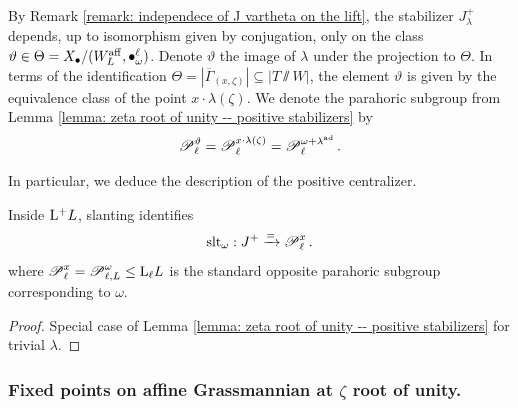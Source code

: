 \begin{remark}\label{remark: positive stabilizers -- zeta root of unity}
By Remark \ref{remark: independece of J vartheta on the lift}, the stabilizer $J^{+}_{\lambda}$ depends, up to isomorphism given by conjugation, only on the class $\vartheta \in \Theta = X_{\bullet} / (W^{\mathrm{aff}}_{L}, \bullet^{\ell}_{\omega})$. Denote $\vartheta$ the image of $\lambda$ under the projection to $\Theta$. In terms of the identification $\Theta = |\overline{\Gamma}_{(x, \zeta)}| \subseteq |T \sslash W|$, the element $\vartheta$ is given by the equivalence class of the point $x \cdot \lambda(\zeta)$. We denote the parahoric subgroup from Lemma \ref{lemma: zeta root of unity -- positive stabilizers} by
\begin{equation*}
 \operatorname{\mathscr{P}}^{\vartheta}_{\ell} 
 = \operatorname{\mathscr{P}}^{x \cdot \lambda(\zeta)}_{\ell} 
 = \operatorname{\mathscr{P}}_{\ell}^{\omega+\lambda^{\operatorname{ad}}}.  
\end{equation*}    
\end{remark}

In particular, we deduce the description of the positive centralizer.
\begin{lemma}\label{lemma: zeta root of unity -- positive centralizer}
\label{lemma: H^+ conjugates to P via alpha general case roots of unity}
Inside $\mathrm{L^+} L$, slanting identifies
\begin{equation*}
\operatorname{slt}_{\omega}: J^{+} \xrightarrow{=} \operatorname{\mathscr{P}}_{\ell}^{x}.
\end{equation*}
where $\operatorname{\mathscr{P}}_{\ell}^{x} = \operatorname{\mathscr{P}}_{\ell, L}^{\omega} \leq \mathrm{L}_{\ell} L$ is the standard opposite parahoric subgroup corresponding to $\omega$.
\end{lemma}
\begin{proof} 
Special case of Lemma \ref{lemma: zeta root of unity -- positive stabilizers} for trivial $\lambda$.
\end{proof}




\subsubsection{Fixed points on affine Grassmannian at \texorpdfstring{$\zeta$}{zeta} root of unity.}

